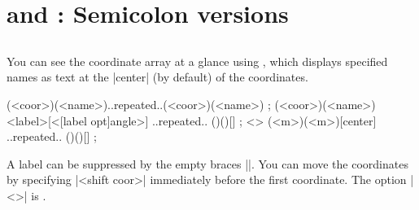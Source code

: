 \section{\protect\cmd{\tzcoorsquick} and \protect\cmd{\tzcoorsquick*}: Semicolon versions}
\label{s:tzcoorsquick}

\subsection{\protect\cmd{\tzcoorsquick}}
\label{ss:tzcoorsquick}

You can see the coordinate array at a glance using \icmd{\tzcoorsquick}, which displays specified names as text at the |center| (by default) of the coordinates.

\begin{tzdef}
\tzcoorsquick(<coor>)(<name>)..repeated..(<coor>)(<name>) ;
(<coor>)(<name>){<label>}[<[label opt]angle>]
                                     ..repeated.. ()(){}[] ;
  <> (<m>)(<m>){}[center] ..repeated.. ()(){}[] ;
\end{tzdef}

\begin{tzcode}{.3}
{}
\end{tzcode}

A label can be suppressed by the empty braces |{}|.
You can move the coordinates by specifying |<shift coor>| immediately before the first coordinate. The  option |<>| is .

\begin{tzcode}{.3}
\end{tzcode}


\subsection{\protect\cmd{\tzcoorsquick*}}
\label{ss:tzcoorsquick*}

